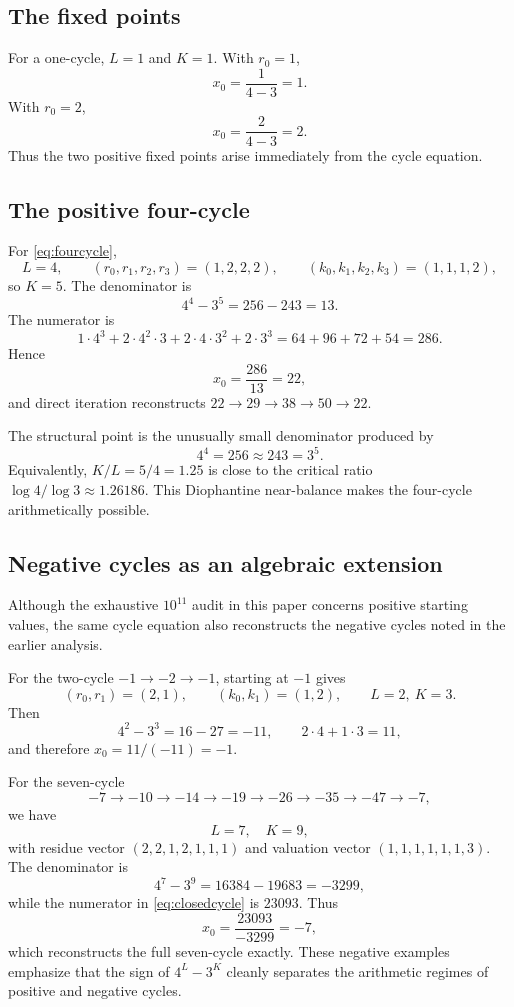 \documentclass[11pt]{article}
\begin{document}
\subsection{The fixed points}
For a one-cycle, $L=1$ and $K=1$.  With $r_0=1$,
\[
x_0=\frac{1}{4-3}=1.
\]
With $r_0=2$,
\[
x_0=\frac{2}{4-3}=2.
\]
Thus the two positive fixed points arise immediately from the cycle equation.

\subsection{The positive four-cycle}
For \eqref{eq:fourcycle},
\[
L=4,\qquad
(r_0,r_1,r_2,r_3)=(1,2,2,2),
\qquad
(k_0,k_1,k_2,k_3)=(1,1,1,2),
\]
so $K=5$.  The denominator is
\begin{equation}
4^4-3^5=256-243=13.
\end{equation}
The numerator is
\[
1\cdot4^3
+2\cdot4^2\cdot3
+2\cdot4\cdot3^2
+2\cdot3^3
=64+96+72+54=286.
\]
Hence
\begin{equation}
x_0=\frac{286}{13}=22,
\end{equation}
and direct iteration reconstructs
$22\to29\to38\to50\to22$.

The structural point is the unusually small denominator produced by
\begin{equation}
4^4=256\approx243=3^5.
\end{equation}
Equivalently, $K/L=5/4=1.25$ is close to the critical ratio $\log4/\log3\approx1.26186$.  This Diophantine near-balance makes the four-cycle arithmetically possible.

\subsection{Negative cycles as an algebraic extension}
Although the exhaustive $10^{11}$ audit in this paper concerns positive starting values, the same cycle equation also reconstructs the negative cycles noted in the earlier analysis.

For the two-cycle $-1\to-2\to-1$, starting at $-1$ gives
\[
(r_0,r_1)=(2,1),\qquad(k_0,k_1)=(1,2),
\qquad L=2,\ K=3.
\]
Then
\[
4^2-3^3=16-27=-11,
\qquad
2\cdot4+1\cdot3=11,
\]
and therefore $x_0=11/(-11)=-1$.

For the seven-cycle
\begin{equation}
-7\to-10\to-14\to-19\to-26\to-35\to-47\to-7,
\end{equation}
we have
\[
L=7,\quad K=9,
\]
with residue vector $(2,2,1,2,1,1,1)$ and valuation vector $(1,1,1,1,1,1,3)$.  The denominator is
\[
4^7-3^9=16384-19683=-3299,
\]
while the numerator in \eqref{eq:closedcycle} is $23093$.  Thus
\[
x_0=\frac{23093}{-3299}=-7,
\]
which reconstructs the full seven-cycle exactly.  These negative examples emphasize that the sign of $4^L-3^K$ cleanly separates the arithmetic regimes of positive and negative cycles.
\end{document}
